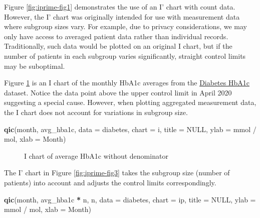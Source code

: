 \documentclass[
]{book}
\makeatletter
\newenvironment{Shaded}{\begin{snugshade}}{\end{snugshade}}
\newcommand{\AttributeTok}[1]{\textcolor[rgb]{0.13,0.29,0.53}{#1}}
\newcommand{\ConstantTok}[1]{\textcolor[rgb]{0.56,0.35,0.01}{#1}}
\newcommand{\FunctionTok}[1]{\textcolor[rgb]{0.13,0.29,0.53}{\textbf{#1}}}
\newcommand{\NormalTok}[1]{#1}
\newcommand{\SpecialCharTok}[1]{\textcolor[rgb]{0.81,0.36,0.00}{\textbf{#1}}}
\newcommand{\StringTok}[1]{\textcolor[rgb]{0.31,0.60,0.02}{#1}}
\newcommand*\pandocbounded[1]{%
  \sbox\pandoc@box{#1}%
  \Gscale@div\@tempa{\textheight}{\dimexpr\ht\pandoc@box+\dp\pandoc@box\relax}%
  \Gscale@div\@tempb{\linewidth}{\wd\pandoc@box}%
  \ifdim\@tempb\p@<\@tempa\p@\let\@tempa\@tempb\fi%
  \ifdim\@tempa\p@<\p@\scalebox{\@tempa}{\usebox\pandoc@box}%
  \else\usebox{\pandoc@box}%
  \fi%
}
\makeatother
\begin{document}
Figure \ref{fig:iprime-fig1} demonstrates the use of an I' chart with count data. However, the I' chart was originally intended for use with measurement data where subgroup sizes vary. For example, due to privacy considerations, we may only have access to averaged patient data rather than individual records. Traditionally, such data would be plotted on an original I chart, but if the number of patients in each subgroup varies significantly, straight control limits may be suboptimal.

Figure \ref{fig:iprime-fig2} is an I chart of the monthly HbA1c averages from the \hyperref[diabetes-hba1c]{Diabetes HbA1c} dataset. Notice the data point above the upper control limit in April 2020 suggesting a special cause. However, when plotting aggregated measurement data, the I chart does not account for variations in subgroup size.

\begin{Shaded}
\begin{Highlighting}[]
\FunctionTok{qic}\NormalTok{(month, avg\_hba1c, }
    \AttributeTok{data  =}\NormalTok{ diabetes, }
    \AttributeTok{chart =} \StringTok{\textquotesingle{}i\textquotesingle{}}\NormalTok{,}
    \AttributeTok{title =} \ConstantTok{NULL}\NormalTok{,}
    \AttributeTok{ylab  =} \StringTok{\textquotesingle{}mmol / mol\textquotesingle{}}\NormalTok{,}
    \AttributeTok{xlab  =} \StringTok{\textquotesingle{}Month\textquotesingle{}}\NormalTok{)}
\end{Highlighting}
\end{Shaded}

\begin{figure}
\centering
\pandocbounded{}
\caption{\label{fig:iprime-fig2}I chart of average HbA1c without denominator}
\end{figure}

The I' chart in Figure \ref{fig:iprime-fig3} takes the subgroup size (number of patients) into account and adjusts the control limits correspondingly.

\begin{Shaded}
\begin{Highlighting}[]
\FunctionTok{qic}\NormalTok{(month, avg\_hba1c }\SpecialCharTok{*}\NormalTok{ n, n, }
    \AttributeTok{data  =}\NormalTok{ diabetes, }
    \AttributeTok{chart =} \StringTok{\textquotesingle{}ip\textquotesingle{}}\NormalTok{,}
    \AttributeTok{title =} \ConstantTok{NULL}\NormalTok{,}
    \AttributeTok{ylab  =} \StringTok{\textquotesingle{}mmol / mol\textquotesingle{}}\NormalTok{,}
    \AttributeTok{xlab  =} \StringTok{\textquotesingle{}Month\textquotesingle{}}\NormalTok{)}
\end{Highlighting}
\end{Shaded}
\end{document}
